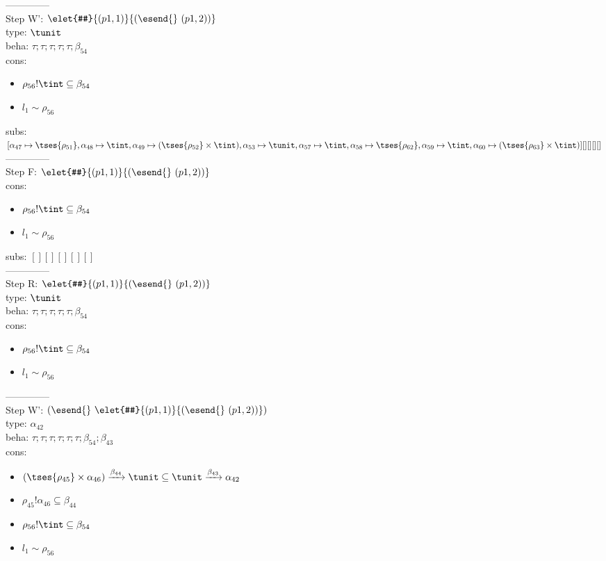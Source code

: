 \documentclass[12pt]{article}
\begin{document}
  --------------\\ 
Step W': $ \elet{#}{(p1, 1)}{(\esend{}~(p1, 2))} $\\
  type: $ \tunit $ 
\\  beha: $ \tau; \tau; \tau; \tau; \tau; \beta_{54} $ 
\\  cons: \begin{itemize}
\item $ \rho_{56}!\tint \subseteq \beta_{54} $
\item $ l_{1} \sim\rho_{56} $
\end{itemize} 
  subs:  $ [ \alpha_{47}\mapsto \tses{ \rho_{51}}, \alpha_{48}\mapsto\tint, \alpha_{49}\mapsto( \tses{ \rho_{52}} \times \tint), \alpha_{53}\mapsto\tunit, \alpha_{57}\mapsto\tint, \alpha_{58}\mapsto \tses{ \rho_{62}}, \alpha_{59}\mapsto\tint, \alpha_{60}\mapsto( \tses{ \rho_{63}} \times \tint)] [] [] [] [] $  
 \\--------------\\ 
Step F: $ \elet{#}{(p1, 1)}{(\esend{}~(p1, 2))} $
 \\ cons: \begin{itemize}
\item $ \rho_{56}!\tint \subseteq \beta_{54} $
\item $ l_{1} \sim\rho_{56} $
\end{itemize}
 subs:  $ [ ] [] [] [] [] $ 
  \\--------------\\ 
Step R: $ \elet{#}{(p1, 1)}{(\esend{}~(p1, 2))} $\\
  type: $ \tunit $ 
\\  beha: $ \tau; \tau; \tau; \tau; \tau; \beta_{54} $ 
\\  cons: \begin{itemize}
\item $ \rho_{56}!\tint \subseteq \beta_{54} $
\item $ l_{1} \sim\rho_{56} $
\end{itemize} 
  --------------\\ 
Step W': $ (\esend{}~\elet{#}{(p1, 1)}{(\esend{}~(p1, 2))}) $\\
  type: $ \alpha_{42} $ 
\\  beha: $ \tau; \tau; \tau; \tau; \tau; \tau; \beta_{54}; \beta_{43} $ 
\\  cons: \begin{itemize}
\item $ ( \tses{ \rho_{45}} \times \alpha_{46}) \xrightarrow{\beta_{44}} \tunit \subseteq \tunit \xrightarrow{\beta_{43}} \alpha_{42} $
\item $ \rho_{45}!\alpha_{46} \subseteq \beta_{44} $
\item $ \rho_{56}!\tint \subseteq \beta_{54} $
\item $ l_{1} \sim\rho_{56} $
\end{itemize} 
\end{document}
